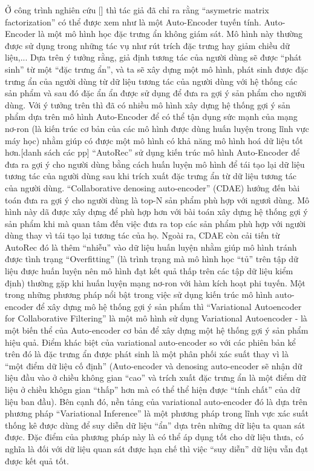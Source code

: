 Ở công trình nghiên cứu [] thì tác giả đã chỉ ra rằng ``asymetric matrix factorization'' có thể được xem như là một Auto-Encoder tuyến tính. Auto-Encoder là một mô hình học đặc trưng ẩn không giám sát. Mô hình này thường được sử dụng trong những tác vụ như rút trích đặc trưng hay giảm chiều dữ liệu,... Dựa trên ý tưởng rằng, giả định tương tác của người dùng sẽ được ``phát sinh'' từ một ``đặc trưng ẩn'', và ta sẽ xây dựng một mô hình, phát sinh được đặc trưng ẩn của người dùng từ dữ liệu tương tác của người dùng với hệ thống các sản phẩm và sau đó đặc ẩn ẩn được sử dụng để đưa ra gợi ý sản phẩm cho người dùng. Với ý tưởng trên thì đã có nhiều mô hình xây dựng hệ thống gợi ý sản phẩm dựa trên mô hình Auto-Encoder để có thể tận dụng sức mạnh của mạng nơ-ron (là kiến trúc cơ bản của các mô hình được dùng huấn luyện trong lĩnh vực máy học) nhằm giúp có được một mô hình có khả năng mô hình hoá dữ liệu tốt hơn.[danh sách các pp]
``AutoRec'' sử dụng kiến trúc mô hình Auto-Encoder để đưa ra gợi ý cho người dùng bằng cách huấn luyện mô hình để tái tạo lại dữ liệu tương tác của người dùng sau khi trích xuất đặc trưng ẩn từ dữ liệu tương tác của người dùng. ``Collaborative denosing auto-encoder'' (CDAE) hướng đến bài toán đưa ra gợi ý cho người dùng là top-N sản phẩm phù hợp với ngươì dùng. Mô hình này dã được xây dựng để phù hợp hơn với bài toán xây dựng hệ thống gợi ý sản phẩm khi mà quan tâm đến việc đưa ra top các sản phẩm phù hợp với người dùng thay vì tái tạo lại tương tác của họ. Ngoài ra, CDAE còn cải tiến từ AutoRec đó là thêm ``nhiễu'' vào dữ liệu huấn luyện nhằm giúp mô hình tránh được tình trạng ``Overfitting'' (là trình trạng mà mô hình học ``tủ'' trên tập dữ liệu được huấn luyện nên mô hình đạt kết quả thấp trên các tập dữ liệu kiểm định) thường gặp khi huấn luyện mạng nơ-ron với hàm kích hoạt phi tuyến.
Một trong những phương pháp nổi bật trong việc sử dụng kiến trúc mô hình auto-encoder để xây dựng mô hệ thống gợi ý sản phẩm thì ``Variational Autoencoder for Collaborative Filtering'' là một mô hình sử dụng Variational Autoencoder - là một biến thể của Auto-encoder cơ bản để xây dựng một hệ thống gợi ý sản phẩm hiệu quả.
Điểm khác biệt của variational auto-encoder so với các phiên bản kể trên đó là đặc trưng ẩn được phát sinh là một phân phối xác suất thay vì là ``một điểm dữ liệu cố định'' (Auto-encoder và denosing auto-encoder sẽ nhận dữ liệu đầu vào ở chiều không gian ``cao'' và trích xuất đặc trưng ẩn là một điểm dữ liệu ở chiều khôgn gian ``thấp'' hơn mà có thể thể hiện được ``tính chất'' của dữ liệu ban đầu). Bên cạnh đó, nền tảng của variational auto-encoder đó là dựa trên phương pháp ``Variational Inference'' là một phương pháp trong lĩnh vực xác suất thống kê được dùng để suy diễn dữ liệu ``ẩn'' dựa trên những dữ liệu ta quan sát được. Đặc điểm của phương pháp này là có thể áp dụng tốt cho dữ liệu thưa, có nghĩa là đối với dữ liệu quan sát được hạn chế thì việc ``suy diễn'' dữ liệu vẫn đạt được kết quả tốt.
